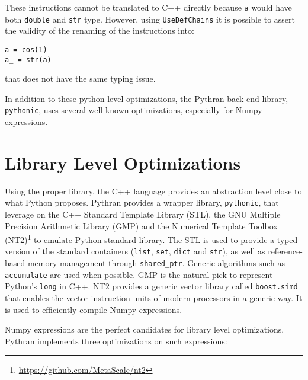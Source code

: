 \documentclass[10pt, onecolumn, preprint]{sigplanconf}
\begin{document}
These instructions cannot be translated to C++ directly because \texttt{a}
would have both \texttt{double} and \texttt{str} type. However, using
\texttt{UseDefChains} it is possible to assert the validity of the renaming of
the instructions into:


\begin{lstlisting}
a = cos(1)
a_ = str(a)
\end{lstlisting}

that does not have the same typing issue.

In addition to these python-level optimizations, the Pythran back end library,
\texttt{pythonic}, uses several well known optimizations, especially for Numpy
expressions.

\section{Library Level Optimizations}
\label{sec:backend}

Using the proper library, the C++ language provides an abstraction level close
to what Python proposes. Pythran provides a wrapper library, \texttt{pythonic},
that leverage on the C++ Standard Template Library (STL), the GNU Multiple
Precision Arithmetic Library (GMP) and the Numerical Template Toolbox
(NT2)\footnote{\url{https://github.com/MetaScale/nt2}} to emulate Python
standard library. The STL is used to provide a typed version of the standard
containers (\texttt{list}, \texttt{set}, \texttt{dict} and \texttt{str}), as
well as reference-based memory management through \texttt{shared\_ptr}. Generic
algorithms such as \texttt{accumulate} are used when possible. GMP is the
natural pick to represent Python's \texttt{long} in C++. NT2 provides a generic
vector library called \texttt{boost.simd}\cite{esterie2012boost} that enables
the vector instruction units of modern processors in a generic way. It is used
to efficiently compile Numpy expressions.

Numpy expressions are the perfect candidates for library level optimizations.
Pythran implements three optimizations on such expressions:
\end{document}
